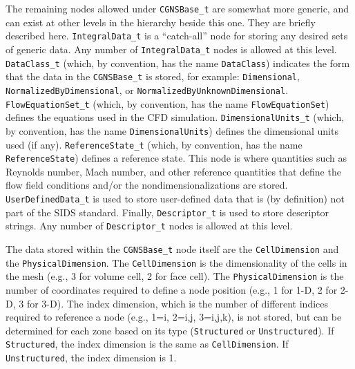 \documentclass[12pt]{article}
\begin{document}
The remaining nodes allowed under {\tt CGNSBase\_t} are somewhat
more generic, and can exist at other levels in the hierarchy
beside this one.  They are briefly described here.
{\tt IntegralData\_t} is a ``catch-all'' node for storing any 
desired sets of generic data.  Any number of {\tt IntegralData\_t}
nodes is allowed at this level. 
{\tt DataClass\_t} (which, by convention, has the name {\tt DataClass})
indicates the form that the data in the {\tt CGNSBase\_t} is
stored, for example:  {\tt Dimensional}, {\tt NormalizedByDimensional},
or {\tt NormalizedByUnknownDimensional}. 
{\tt FlowEquationSet\_t} 
(which, by convention, has the name {\tt FlowEquationSet})
defines the equations used in the CFD
simulation.  {\tt DimensionalUnits\_t} (which, by convention, has the name 
{\tt DimensionalUnits})
defines the dimensional units used (if any).  {\tt ReferenceState\_t}
(which, by convention, has the name {\tt ReferenceState})
defines a reference state.  This node is where quantities such
as Reynolds number, Mach number, and other reference quantities
that define the flow field conditions and/or the 
nondimensionalizations are stored.  {\tt UserDefinedData\_t} is used to store
user-defined data that is (by definition) not part of the SIDS standard.
Finally, {\tt Descriptor\_t}
is used to store descriptor strings. 
Any number of {\tt Descriptor\_t} nodes is allowed at this level.

The data stored within the {\tt CGNSBase\_t} node itself are the 
{\tt CellDimension} and the {\tt PhysicalDimension}.  The {\tt CellDimension}
is the dimensionality of the cells in the mesh
(e.g., 3 for volume cell, 2 for face cell).  The {\tt PhysicalDimension}
is the number of coordinates required to
define a node position (e.g., 1 for 1-D, 2 for 2-D, 3 for 3-D).
The index dimension, which is the number of different indices required
to reference a node (e.g., 1=i, 2=i,j, 3=i,j,k), is not stored,
but can be determined for each zone
based on its type ({\tt Structured} or {\tt Unstructured}).  If
{\tt Structured}, the index dimension is the same as {\tt CellDimension}.
If {\tt Unstructured}, the index dimension is 1.
\end{document}
